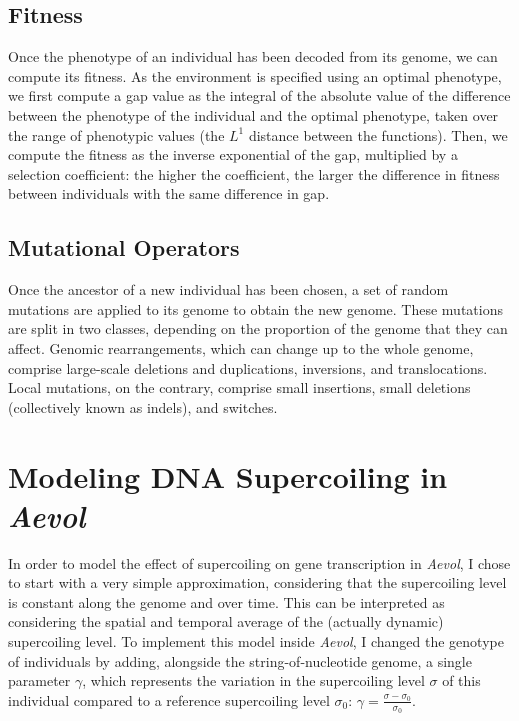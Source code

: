 \subsection{Fitness}

Once the phenotype of an individual has been decoded from its genome, we can compute its fitness.
As the environment is specified using an optimal phenotype, we first compute a gap value as the integral of the absolute value of the difference between the phenotype of the individual and the optimal phenotype, taken over the range of phenotypic values (the $L^1$ distance between the functions).
Then, we compute the fitness as the inverse exponential of the gap, multiplied by a selection coefficient: the higher the coefficient, the larger the difference in fitness between individuals with the same difference in gap.

\subsection{Mutational Operators}

Once the ancestor of a new individual has been chosen, a set of random mutations are applied to its genome to obtain the new genome.
These mutations are split in two classes, depending on the proportion of the genome that they can affect.
Genomic rearrangements, which can change up to the whole genome, comprise large-scale deletions and duplications, inversions, and translocations.
Local mutations, on the contrary, comprise small insertions, small  deletions (collectively known as indels), and switches.

\section{Modeling DNA Supercoiling in \emph{Aevol}}

In order to model the effect of supercoiling on gene transcription in \emph{Aevol}, I chose to start with a very simple approximation, considering that the supercoiling level is constant along the genome and over time.
This can be interpreted as considering the spatial and temporal average of the (actually dynamic) supercoiling level.
To implement this model inside \emph{Aevol}, I changed the genotype of individuals by adding, alongside the string-of-nucleotide genome, a single parameter $\gamma$, which represents the variation in the supercoiling level $\sigma$ of this individual compared to a reference supercoiling level $\sigma_0$: $\gamma = \frac{\sigma-\sigma_0}{\sigma_0}$.

